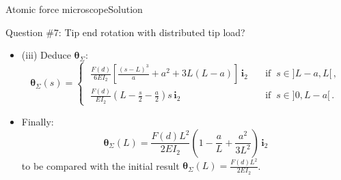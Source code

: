 \documentclass{beamer}
\renewcommand{\ij}{i}
\newcommand{\iv}{{\boldsymbol\ij}}
\newcommand*{\drotj}{\theta}
\newcommand*{\drot}{{\boldsymbol\drotj}}
\begin{document}
\begin{frame}{Atomic force microscope}{Solution}
\begin{overprint}
\vskip-20pt
\begin{exampleblock}{Question \#7: Tip end rotation with distributed tip load?}
\begin{itemize}
\item (iii) Deduce $\drot_\Sigma$:
\begin{displaymath}
\drot_\Sigma(s)=\left\{\begin{array}{cl}
\;\scriptstyle \frac{F(d)}{6EI_2}\left[\frac{(s-L)^3}{a}+a^2+3L(L-a)\right]\,\iv_2 & \scriptstyle \quad\text{if}\;\;s\in]L-a,L[\,, \\
\;\scriptstyle \frac{F(d)}{EI_2}\left(L-\frac{s}{2}-\frac{a}{2}\right)s\,\iv_2 & \scriptstyle \quad\text{if}\;\;s\in]0,L-a[\,.
\end{array}\right.
\end{displaymath}
\item Finally:
\begin{displaymath}
\drot_\Sigma(L)= \frac{F(d)L^2}{2EI_2}\left(1-\frac{a}{L}+\frac{a^2}{3L^2}\right)\,\iv_2
\end{displaymath}
to be compared with the initial result $\drot_\Sigma(L)=\frac{F(d)L^2}{2EI_2}$.
\end{itemize}
\end{exampleblock}

\end{overprint}

\end{frame}
\end{document}
